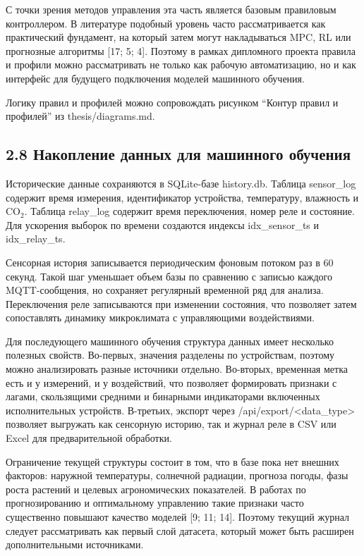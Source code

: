 \documentclass[a4paper,14pt]{extarticle}
\renewcommand{\texttt}[1]{\textnormal{#1}}
\begin{document}
С точки зрения методов управления эта часть является базовым правиловым
контроллером. В литературе подобный уровень часто рассматривается как
практический фундамент, на который затем могут накладываться MPC, RL или
прогнозные алгоритмы {[}17; 5; 4{]}. Поэтому в рамках дипломного проекта
правила и профили можно рассматривать не только как рабочую
автоматизацию, но и как интерфейс для будущего подключения моделей
машинного обучения.

Логику правил и профилей можно сопровождать рисунком ``Контур правил и
профилей'' из \texttt{thesis/diagrams.md}.

\subsection{2.8 Накопление данных для машинного
обучения}\label{ux43dux430ux43aux43eux43fux43bux435ux43dux438ux435-ux434ux430ux43dux43dux44bux445-ux434ux43bux44f-ux43cux430ux448ux438ux43dux43dux43eux433ux43e-ux43eux431ux443ux447ux435ux43dux438ux44f}

Исторические данные сохраняются в SQLite-базе \texttt{history.db}.
Таблица \texttt{sensor\_log} содержит время измерения, идентификатор
устройства, температуру, влажность и CO\(_2\). Таблица
\texttt{relay\_log} содержит время переключения, номер реле и состояние.
Для ускорения выборок по времени создаются индексы
\texttt{idx\_sensor\_ts} и \texttt{idx\_relay\_ts}.

Сенсорная история записывается периодическим фоновым потоком раз в 60
секунд. Такой шаг уменьшает объем базы по сравнению с записью каждого
MQTT-сообщения, но сохраняет регулярный временной ряд для анализа.
Переключения реле записываются при изменении состояния, что позволяет
затем сопоставлять динамику микроклимата с управляющими воздействиями.

Для последующего машинного обучения структура данных имеет несколько
полезных свойств. Во-первых, значения разделены по устройствам, поэтому
можно анализировать разные источники отдельно. Во-вторых, временная
метка есть и у измерений, и у воздействий, что позволяет формировать
признаки с лагами, скользящими средними и бинарными индикаторами
включенных исполнительных устройств. В-третьих, экспорт через
\texttt{/api/export/\textless{}data\_type\textgreater{}} позволяет
выгружать как сенсорную историю, так и журнал реле в CSV или Excel для
предварительной обработки.

Ограничение текущей структуры состоит в том, что в базе пока нет внешних
факторов: наружной температуры, солнечной радиации, прогноза погоды,
фазы роста растений и целевых агрономических показателей. В работах по
прогнозированию и оптимальному управлению такие признаки часто
существенно повышают качество моделей {[}9; 11; 14{]}. Поэтому текущий
журнал следует рассматривать как первый слой датасета, который может
быть расширен дополнительными источниками.
\end{document}

